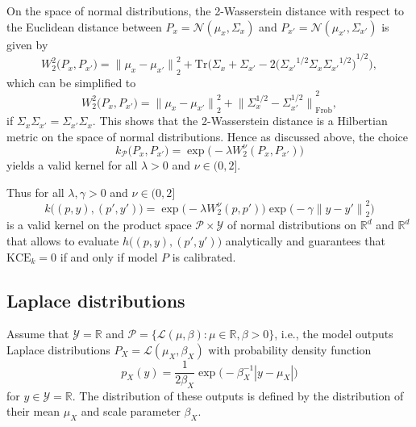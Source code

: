 \documentclass{article}
\begin{document}
On the space of normal distributions, the 2-Wasserstein distance with
respect to the Euclidean distance between
$P_x = \mathcal{N}(\mu_x, \Sigma_x)$ and
$P_{x'} = \mathcal{N}(\mu_{x'}, \Sigma_{x'})$ is given by
\begin{equation*}
    W^2_2\big(P_x, P_{x'}\big)
    = {\|\mu_x - \mu_{x'}\|}_2^2 + \mathrm{Tr}\bigg(\Sigma_x + \Sigma_{x'} - 2{\Big({\Sigma_{x'}}^{1/2} \Sigma_x {\Sigma_{x'}}^{1/2}\Big)}^{1/2}\bigg),
\end{equation*}
which can be simplified to
\begin{equation*}
    W^2_2\big(P_x, P_{x'}\big)
    = {\big\|\mu_x - \mu_{x'}\big\|}_2^2 + {\Big\|\Sigma_{x}^{1/2} - \Sigma_{x'}^{1/2}\Big\|}_{\mathrm{Frob}}^2,
\end{equation*}
if $\Sigma_x \Sigma_{x'} = \Sigma_{x'} \Sigma_x$. This shows that the
2-Wasserstein distance is a Hilbertian metric on the space of normal
distributions. Hence as discussed above, the choice
\begin{equation*}
    k_{\mathcal{P}}\big(P_x, P_{x'}\big) = \exp{\big( - \lambda W_2^\nu(P_x, P_{x'})\big)}
\end{equation*}
yields a valid kernel for all $\lambda > 0$ and $\nu \in (0, 2]$.

Thus for all $\lambda, \gamma > 0$ and $\nu \in (0, 2]$
\begin{equation*}
    k\big((p, y), (p', y')\big) = \exp{\big(-\lambda W^\nu_2(p, p')\big)} \exp{\Big(-\gamma {\|y-y'\|}^2_2\Big)}
\end{equation*}
is a valid kernel on the product space $\mathcal{P} \times \mathcal{Y}$
of normal distributions on $\mathbb{R}^d$ and $\mathbb{R}^d$ that allows to evaluate
$h\big((p, y), (p', y')\big)$ analytically and guarantees that $\mathrm{KCE}_k = 0$
if and only if model $P$ is calibrated.

\subsection{Laplace distributions}
\label{app:laplace}

Assume that $\mathcal{Y} = \mathbb{R}$ and
$\mathcal{P} = \{\mathcal{L}(\mu, \beta) \colon \mu \in \mathbb{R}, \beta > 0\}$,
i.e., the model outputs Laplace distributions $P_X = \mathcal{L}(\mu_X, \beta_X)$ with
probability density function
\begin{equation*}
    p_X(y) = \frac{1}{2 \beta_X} \exp{\big(- \beta_X^{-1} |y - \mu_X| \big)}
\end{equation*}
for $y \in \mathcal{Y} = \mathbb{R}$. The distribution of these outputs is
defined by the distribution of their mean $\mu_X$ and scale parameter $\beta_X$.
\end{document}

